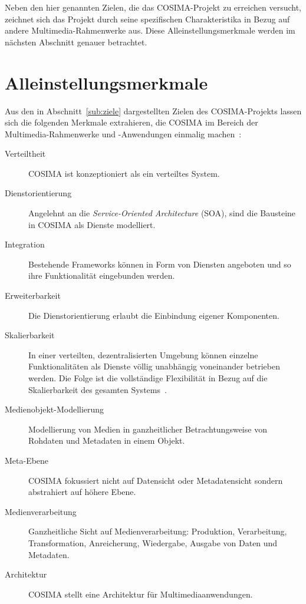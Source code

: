   Neben den hier genannten Zielen, die das COSIMA-Projekt zu erreichen versucht, zeichnet sich das Projekt durch seine spezifischen Charakteristika in Bezug auf andere Multimedia-Rahmenwerke aus. Diese Alleinstellungsmerkmale werden im nächsten Abschnitt genauer betrachtet.


  

\section{Alleinstellungsmerkmale} %
\label{sec:alleinstellungsmerkmale}

  Aus den in Abschnitt~\ref{sub:ziele} dargestellten Zielen des COSIMA-Projekts lassen sich die folgenden Merkmale extrahieren, die COSIMA im Bereich der Multimedia-Rahmenwerke und -Anwendungen einmalig machen~\citep[S. 3f]{bericht}:
  
  \begin{description}
    \item[Verteiltheit] COSIMA ist konzeptioniert als ein verteiltes System.
    \item[Dienstorientierung] Angelehnt an die \emph{Service-Oriented Architecture} (SOA), sind die Bausteine in COSIMA als Dienste modelliert.
    \item[Integration] Bestehende Frameworks können in Form von Diensten angeboten und so ihre Funktionalität eingebunden werden.
    \item[Erweiterbarkeit] Die Dienstorientierung erlaubt die Einbindung eigener Komponenten.
    \item[Skalierbarkeit] In einer verteilten, dezentralisierten Umgebung können einzelne Funktionalitäten als Dienste völlig unabhängig voneinander betrieben werden. Die Folge ist die vollständige Flexibilität in Bezug auf die Skalierbarkeit des gesamten Systems~\citep[S. 294]{web_services_principles_and_technology}.
    \item[Medienobjekt-Modellierung] Modellierung von Medien in ganzheitlicher Betrachtungsweise von Rohdaten und Metadaten in einem Objekt.
    \item[Meta-Ebene] COSIMA fokussiert nicht auf Datensicht oder Metadatensicht sondern abstrahiert auf höhere Ebene.
    \item[Medienverarbeitung] Ganzheitliche Sicht auf Medienverarbeitung: Produktion, Verarbeitung, Transformation, Anreicherung, Wiedergabe, Ausgabe von Daten und Metadaten.
    \item[Architektur] COSIMA stellt eine Architektur für Multimediaanwendungen.
  \end{description}
  
